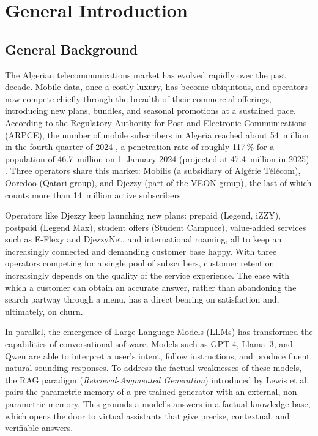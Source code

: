 \documentclass[12pt, a4paper]{report}
\newcommand{\sourced}[1]{#1}        %
\newcommand{\humantext}[1]{#1}      %
\begin{document}

\chapter*{General Introduction}

\section*{General Background}
\humantext{The Algerian telecommunications market has evolved rapidly over the past decade. Mobile data, once a costly luxury, has become ubiquitous, and operators now compete chiefly through the breadth of their commercial offerings, introducing new plans, bundles, and seasonal promotions at a sustained pace.} \sourced{According to the Regulatory Authority for Post and Electronic Communications (ARPCE), the number of mobile subscribers in Algeria reached about 54~million in the fourth quarter of 2024 \cite{arpce2024}, a penetration rate of roughly 117\,\% for a population of 46.7~million on 1~January 2024 (projected at 47.4~million in 2025) \cite{ons2025}.} \sourced{Three operators share this market: Mobilis (a subsidiary of Algérie Télécom), Ooredoo (Qatari group), and Djezzy (part of the VEON group), the last of which counts more than 14~million active subscribers.}

\sourced{Operators like Djezzy keep launching new plans: prepaid (Legend, iZZY), postpaid (Legend Max), student offers (Student Campuce), value-added services such as E-Flexy and DjezzyNet, and international roaming, all to keep an increasingly connected and demanding customer base happy.} \humantext{With three operators competing for a single pool of subscribers, customer retention increasingly depends on the quality of the service experience. The ease with which a customer can obtain an accurate answer, rather than abandoning the search partway through a menu, has a direct bearing on satisfaction and, ultimately, on churn.}

\humantext{In parallel, the emergence of Large Language Models (LLMs) has transformed the capabilities of conversational software. Models such as GPT-4, Llama~3, and Qwen are able to interpret a user's intent, follow instructions, and produce fluent, natural-sounding responses.} \sourced{To address the factual weaknesses of these models, the RAG paradigm (\textit{Retrieval-Augmented Generation}) introduced by Lewis et al. \cite{lewis2020rag} pairs the parametric memory of a pre-trained generator with an external, non-parametric memory.} \sourced{This grounds a model's answers in a factual knowledge base, which opens the door to virtual assistants that give precise, contextual, and verifiable answers.}
\end{document}
